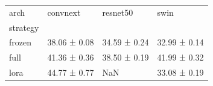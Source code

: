 \begin{tabular}{llll}
\toprule
arch & convnext & resnet50 & swin \\
strategy &  &  &  \\
\midrule
frozen & 38.06 ± 0.08 & 34.59 ± 0.24 & 32.99 ± 0.14 \\
full & 41.36 ± 0.36 & 38.50 ± 0.19 & 41.99 ± 0.32 \\
lora & 44.77 ± 0.77 & NaN & 33.08 ± 0.19 \\
\bottomrule
\end{tabular}
